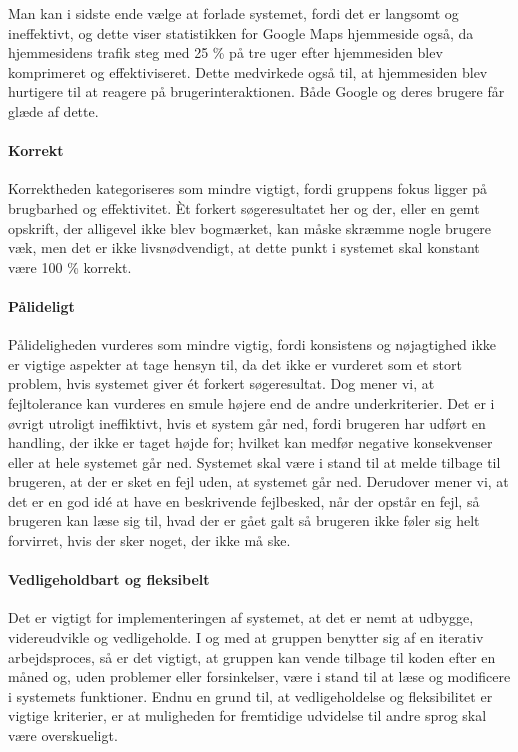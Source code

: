Man kan i sidste ende vælge at forlade systemet, fordi det er langsomt og ineffektivt, og dette viser statistikken for Google Maps hjemmeside også, da hjemmesidens trafik steg med 25 \% på tre uger efter hjemmesiden blev komprimeret og effektiviseret. Dette medvirkede også til, at hjemmesiden blev hurtigere til at reagere på brugerinteraktionen. Både Google og deres brugere får glæde af dette.

\paragraph{Korrekt} Korrektheden kategoriseres som mindre vigtigt, fordi gruppens fokus ligger på brugbarhed og effektivitet. Èt forkert søgeresultatet her og der, eller en gemt opskrift, der alligevel ikke blev bogmærket, kan måske skræmme nogle brugere væk, men det er ikke livsnødvendigt, at dette punkt i systemet skal konstant være 100 \% korrekt.

\paragraph{Pålideligt} Pålideligheden vurderes som mindre vigtig, fordi konsistens og nøjagtighed ikke er vigtige aspekter at tage hensyn til, da det ikke er vurderet som et stort problem, hvis systemet giver ét forkert søgeresultat. Dog mener vi, at fejltolerance kan vurderes en smule højere end de andre underkriterier. Det er i øvrigt utroligt ineffiktivt, hvis et system går ned, fordi brugeren har udført en handling, der ikke er taget højde for; hvilket kan medfør negative konsekvenser eller at hele systemet går ned. Systemet skal være i stand til at melde tilbage til brugeren, at der er sket en fejl uden, at systemet går ned. Derudover mener vi, at det er en god idé at have en beskrivende fejlbesked, når der opstår en fejl, så brugeren kan læse sig til, hvad der er gået galt så brugeren ikke føler sig helt forvirret, hvis der sker noget, der ikke må ske.

\paragraph{Vedligeholdbart og fleksibelt} Det er vigtigt for implementeringen af systemet, at det er nemt at udbygge, videreudvikle og vedligeholde. I og med at gruppen benytter sig af en iterativ arbejdsproces, så er det vigtigt, at gruppen kan vende tilbage til koden efter \fx en måned og, uden problemer eller forsinkelser, være i stand til at læse og modificere i systemets funktioner. Endnu en grund til, at vedligeholdelse og fleksibilitet er vigtige kriterier, er at muligheden for fremtidige udvidelse til \fx andre sprog skal være overskueligt.

